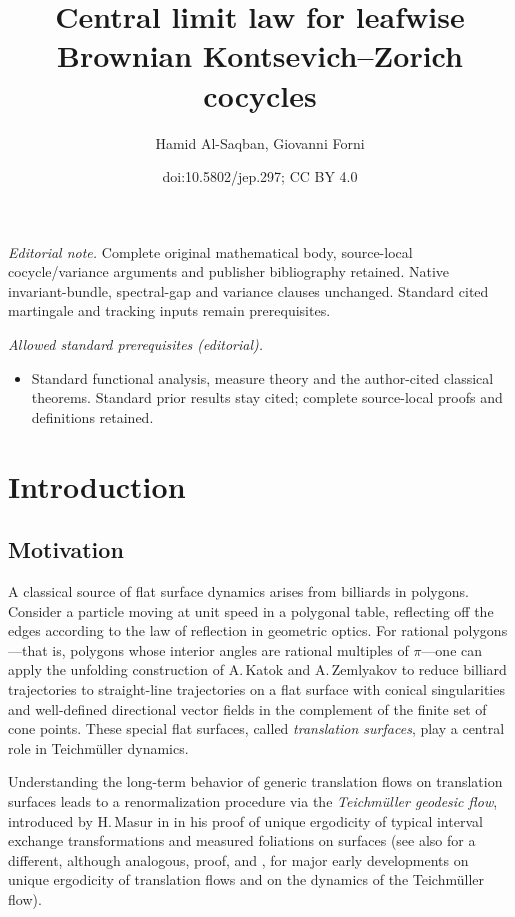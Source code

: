 \documentclass[10pt]{amsart}
\title{Central limit law for leafwise Brownian Kontsevich–Zorich cocycles}
\author{Hamid Al-Saqban, Giovanni Forni}
\date{doi:10.5802/jep.297; CC BY 4.0}
\theoremstyle{plain}
\theoremstyle{definition}
\numberwithin{equation}{subsection}
\begin{document}
\maketitle
\noindent\textit{Editorial note.} Complete original mathematical body, source-local cocycle/variance arguments and publisher bibliography retained. Native invariant-bundle, spectral-gap and variance clauses unchanged. Standard cited martingale and tracking inputs remain prerequisites.\par\medskip
\noindent\textit{Allowed standard prerequisites (editorial).}\begin{itemize}
\item Standard functional analysis, measure theory and the author-cited classical theorems. Standard prior results stay cited; complete source-local proofs and definitions retained.
\end{itemize}\medskip

\tableofcontents


\vspace*{-2.5\baselineskip}\vskip0pt\enlargethispage{.5\baselineskip}%
\section{Introduction}

\subsection{Motivation} A classical source of flat surface dynamics arises from billiards in polygons. Consider a particle moving at unit speed in a polygonal table, reflecting off the edges according to the law of reflection in geometric optics. For rational polygons—that is, polygons whose interior angles are rational multiples of $\pi$—one can apply the unfolding construction of A.\,Katok and A.\,Zemlyakov \cite{ZK75} to reduce billiard trajectories to straight-line trajectories on a flat surface with conical singularities and well-defined directional vector fields in the complement of the finite set of cone points. These special flat surfaces, called \emph{translation surfaces}, play a central role in Teichmüller dynamics.

Understanding the long-term behavior of generic translation flows on translation surfaces leads to a renormalization procedure via the \emph{Teichmüller geodesic flow}, introduced by H.\,Masur in \cite{Ma82} in his proof of unique ergodicity of
typical interval exchange transformations and measured foliations on surfaces (see also \cite{Vc82} for a different, although analogous, proof, and \cite{KMS86}, \cite{Vc86} for major early developments on unique ergodicity of translation flows and on the dynamics of the Teichmüller flow).
\end{document}
